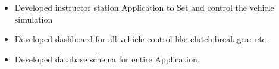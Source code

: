 \documentclass[10pt,a4paper,ragged2e]{altacv}
\begin{document}
\begin{itemize}
\divider

\begin{itemize}
\item Developed instructor station Application to Set and control the vehicle simulation 
\item Developed dashboard for all vehicle control like 
clutch,break,gear etc.
\item Developed database schema for entire Application. 
\end{itemize}




\end{itemize}
















 




%


\end{document}

